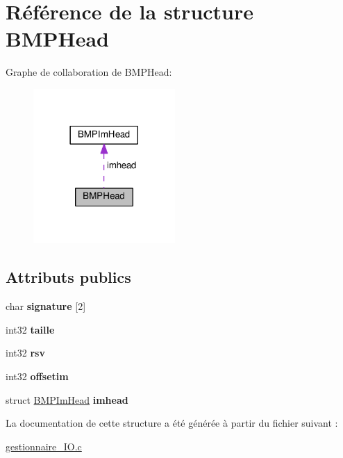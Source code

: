 \hypertarget{structBMPHead}{}\section{Référence de la structure B\+M\+P\+Head}
\label{structBMPHead}


Graphe de collaboration de B\+M\+P\+Head\+:
\nopagebreak
\begin{figure}[H]
\begin{center}
\leavevmode
\includegraphics[width=153pt]{structBMPHead__coll__graph}
\end{center}
\end{figure}
\subsection*{Attributs publics}
\begin{DoxyCompactItemize}
\item 
char {\bfseries signature} \mbox{[}2\mbox{]}\hypertarget{structBMPHead_afae656413fe7c6d5c726dcb859003a35}{}\label{structBMPHead_afae656413fe7c6d5c726dcb859003a35}

\item 
int32 {\bfseries taille}\hypertarget{structBMPHead_a129bb82110980f670597d789823f82b4}{}\label{structBMPHead_a129bb82110980f670597d789823f82b4}

\item 
int32 {\bfseries rsv}\hypertarget{structBMPHead_a7b05c13d2a23c9c98854d2ec5249b2d1}{}\label{structBMPHead_a7b05c13d2a23c9c98854d2ec5249b2d1}

\item 
int32 {\bfseries offsetim}\hypertarget{structBMPHead_aadcf34ce8edd039b3314fda48db52a41}{}\label{structBMPHead_aadcf34ce8edd039b3314fda48db52a41}

\item 
struct \hyperlink{structBMPImHead}{B\+M\+P\+Im\+Head} {\bfseries imhead}\hypertarget{structBMPHead_a4a8c172b2b1c554ef3af69e2a80c95d0}{}\label{structBMPHead_a4a8c172b2b1c554ef3af69e2a80c95d0}

\end{DoxyCompactItemize}


La documentation de cette structure a été générée à partir du fichier suivant \+:\begin{DoxyCompactItemize}
\item 
\hyperlink{gestionnaire__IO_8c}{gestionnaire\+\_\+\+I\+O.\+c}\end{DoxyCompactItemize}
